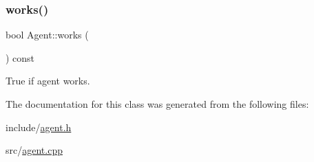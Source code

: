 \subsubsection{\texorpdfstring{works()}{works()}}
{\footnotesize\ttfamily bool Agent\+::works (\begin{DoxyParamCaption}{ }\end{DoxyParamCaption}) const\hspace{0.3cm}{\ttfamily [inline]}}



True if agent works. 



The documentation for this class was generated from the following files\+:\begin{DoxyCompactItemize}
\item 
include/\hyperlink{agent_8h}{agent.\+h}\item 
src/\hyperlink{agent_8cpp}{agent.\+cpp}\end{DoxyCompactItemize}
